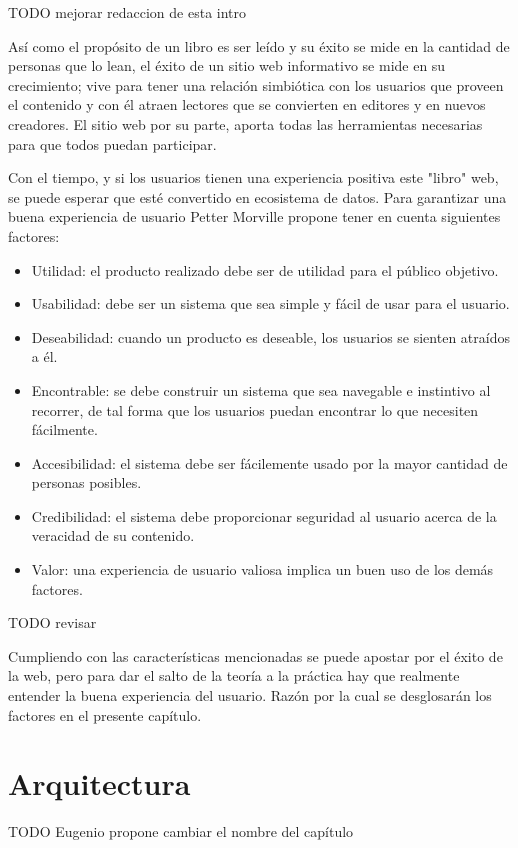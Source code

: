 
TODO mejorar redaccion de esta intro

Así como el propósito de un libro es ser leído y su éxito se mide en la cantidad de personas que lo lean, el éxito de un sitio web informativo se mide en su crecimiento; vive para tener una relación simbiótica con los usuarios que proveen el contenido y con él atraen lectores que se convierten en editores y en nuevos creadores. El sitio web por su parte, aporta todas las herramientas necesarias para que todos puedan participar.

Con el tiempo, y si los usuarios tienen una experiencia positiva este "libro" web, se puede esperar que esté convertido en ecosistema de datos. Para garantizar una buena experiencia de usuario Petter Morville \cite{UXFactors} propone tener en cuenta siguientes factores:

\begin{itemize}
  \item Utilidad: el producto realizado debe ser de utilidad para el público objetivo.
  \item Usabilidad: debe ser un sistema que sea simple y fácil de usar para el usuario.
  \item Deseabilidad: cuando un producto es deseable, los usuarios se sienten atraídos a él.
  \item Encontrable: se debe construir un sistema que sea navegable e instintivo al recorrer, de tal forma que los usuarios puedan encontrar lo que necesiten fácilmente.
  \item Accesibilidad: el sistema debe ser fácilemente usado por la mayor cantidad de personas posibles.
  \item Credibilidad: el sistema debe proporcionar seguridad al usuario acerca de la veracidad de su contenido.
  \item Valor: una experiencia de usuario valiosa implica un buen uso de los demás factores.
\end{itemize}

TODO revisar

Cumpliendo con las características mencionadas se puede apostar por el éxito de la web, pero para dar el salto de la teoría a la práctica hay que realmente entender la buena experiencia del usuario. Razón por la cual se desglosarán los factores en el presente capítulo.

\section{Arquitectura}
TODO Eugenio propone cambiar el nombre del capítulo

